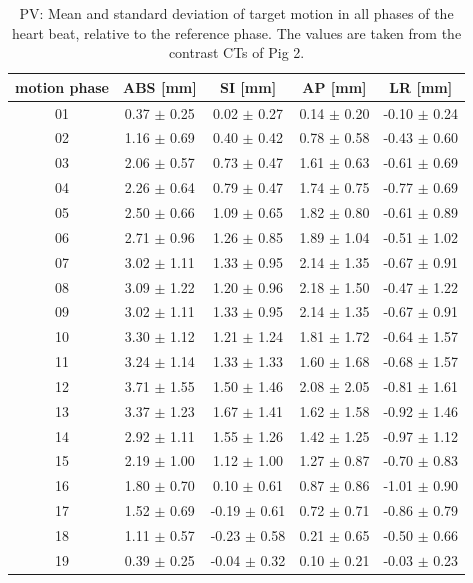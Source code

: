 \documentclass[type=dr, dr=rernat, accentcolor=tud7b,colorbacktitle, bigchapter, openright, twoside, 12pt ]{tudthesis}
\begin{document}
\newpage


\begin{table}[htbp]
  \centering
  \caption{PV: Mean and standard deviation of target motion in all phases of the heart beat, relative to the reference phase. The values are 
  taken from the contrast CTs of Pig 2.}
  \begin{tabular}{|c|c|c|c|c|}
    \hline\hline
    motion phase\rule{0pt}{2.6ex}\rule[-1.2ex]{0pt}{0pt} & ABS [mm] & SI [mm] & AP [mm] & LR [mm]\\
    \hline
01 &0.37 $\pm$ 0.25 &0.02 $\pm$ 0.27 &0.14 $\pm$ 0.20 &-0.10 $\pm$ 0.24 \\
02 &1.16 $\pm$ 0.69 &0.40 $\pm$ 0.42 &0.78 $\pm$ 0.58 &-0.43 $\pm$ 0.60 \\
03 &2.06 $\pm$ 0.57 &0.73 $\pm$ 0.47 &1.61 $\pm$ 0.63 &-0.61 $\pm$ 0.69 \\
04 &2.26 $\pm$ 0.64 &0.79 $\pm$ 0.47 &1.74 $\pm$ 0.75 &-0.77 $\pm$ 0.69 \\
05 &2.50 $\pm$ 0.66 &1.09 $\pm$ 0.65 &1.82 $\pm$ 0.80 &-0.61 $\pm$ 0.89 \\
06 &2.71 $\pm$ 0.96 &1.26 $\pm$ 0.85 &1.89 $\pm$ 1.04 &-0.51 $\pm$ 1.02 \\
07 &3.02 $\pm$ 1.11 &1.33 $\pm$ 0.95 &2.14 $\pm$ 1.35 &-0.67 $\pm$ 0.91 \\
08 &3.09 $\pm$ 1.22 &1.20 $\pm$ 0.96 &2.18 $\pm$ 1.50 &-0.47 $\pm$ 1.22 \\
09 &3.02 $\pm$ 1.11 &1.33 $\pm$ 0.95 &2.14 $\pm$ 1.35 &-0.67 $\pm$ 0.91 \\
10 &3.30 $\pm$ 1.12 &1.21 $\pm$ 1.24 &1.81 $\pm$ 1.72 &-0.64 $\pm$ 1.57 \\
11 &3.24 $\pm$ 1.14 &1.33 $\pm$ 1.33 &1.60 $\pm$ 1.68 &-0.68 $\pm$ 1.57 \\
12 &3.71 $\pm$ 1.55 &1.50 $\pm$ 1.46 &2.08 $\pm$ 2.05 &-0.81 $\pm$ 1.61 \\
13 &3.37 $\pm$ 1.23 &1.67 $\pm$ 1.41 &1.62 $\pm$ 1.58 &-0.92 $\pm$ 1.46 \\
14 &2.92 $\pm$ 1.11 &1.55 $\pm$ 1.26 &1.42 $\pm$ 1.25 &-0.97 $\pm$ 1.12 \\
15 &2.19 $\pm$ 1.00 &1.12 $\pm$ 1.00 &1.27 $\pm$ 0.87 &-0.70 $\pm$ 0.83 \\
16 &1.80 $\pm$ 0.70 &0.10 $\pm$ 0.61 &0.87 $\pm$ 0.86 &-1.01 $\pm$ 0.90 \\
17 &1.52 $\pm$ 0.69 &-0.19 $\pm$ 0.61 &0.72 $\pm$ 0.71 &-0.86 $\pm$ 0.79 \\
18 &1.11 $\pm$ 0.57 &-0.23 $\pm$ 0.58 &0.21 $\pm$ 0.65 &-0.50 $\pm$ 0.66 \\
19 &0.39 $\pm$ 0.25 &-0.04 $\pm$ 0.32 &0.10 $\pm$ 0.21 &-0.03 $\pm$ 0.23 \\
    \hline\hline
  \end{tabular}
  \label{tab:motion:PV:Pig2}
\end{table}
\end{document}
